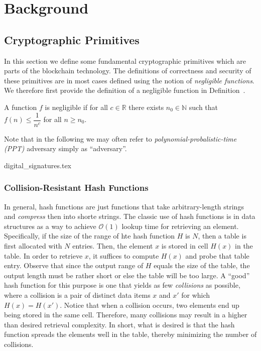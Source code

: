 \chapter{Background}

\section{Cryptographic Primitives}
In this section we define some fundamental cryptographic primitives which are parts of the blockchain technology. The definitions of correctness and security of these primitives are in most cases defined using the notion of \emph{negligible functions}. We therefore first provide the definition of a negligible function in Definition~.

\begin{definition}
	\label{def:negligible_function}
	A function $f$ is \textsf{negligible} if for all $ c \in \mathbb{R}$ there exists $n_0 \in \mathbb{N}$ such that $f(n) \leq \dfrac{1}{n^c}$ for all $ n \geq n_0$. 
\end{definition}

Note that in the following we may often refer to \emph{polynomial-probalistic-time (PPT)} adversary simply as ``adversary''. 

{digital_signatures.tex}

\subsection{Collision-Resistant Hash Functions}
In general, hash functions are just functions that take arbitrary-length strings and \emph{compress} then into shorte strings. The classic use of hash functions is in data structures as a way to achieve $\mathcal{O}(1)$ lookup time for retrieving an element. Specifically, if the size of the range of hte hash function $H$ is $N$, then a table is first allocated with $N$ entries. Then, the element $x$ is stored in cell $H(x)$ in the table. In order to retrieve $x$, it suffices to compute $H(x)$ and probe that table entry. Observe that since the output range of $H$ equals the size of the table, the output length must be rather short or else the table will be too large. A ``good'' hash function for this purpose is one that yields as few \emph{collisions} as possible, where a collision  is a pair of distinct data items $x$ and $x'$ for which $H(x) = H(x')$. Notice that when a collision occurs, two elements end up being stored in the same cell. Therefore, many collisions may result in a higher than desired retrieval complexity. In short, what is desired is that the hash function spreads the elements well in the table, thereby minimizing the number of collisions.

